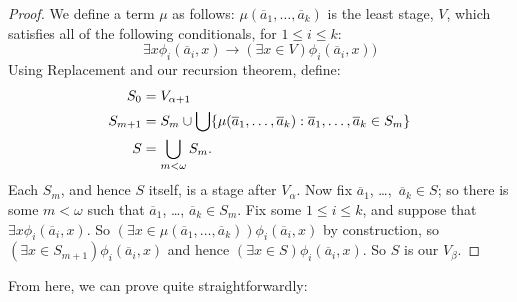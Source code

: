 \documentclass[../../../include/open-logic-section]{subfiles}
\begin{document}
\begin{proof}
We define a term $\mu$ as follows: $\mu(\overline{a}_1, \ldots,
\overline{a}_k)$ is the least stage, $V$, which satisfies all of the
following conditionals, for $1 \leq i \leq k$:
\[
\exists x\phi_i(\overline{a}_i, x) \rightarrow (\exists x \in V) \phi_i(\overline{a}_i, x))
\]
Using Replacement and our recursion theorem, define:
\begin{align*}
	S_0 & = V_{\alpha+1}\\
	S_{m+1} & = S_m \cup \bigcup
	\Setabs{\mu(\overline{a}_1, \ldots, \overline{a}_k)}
	{\overline{a}_1, \ldots, \overline{a}_k \in S_m} \\
	S &= \bigcup_{m < \omega} S_m.
\end{align*}
Each $S_m$, and hence $S$ itself, is a stage after $V_\alpha$. Now fix
$\overline{a}_1$, \dots,~$\overline{a}_k \in S$; so there is some $m <
\omega$ such that $\overline{a}_1$, \dots, $\overline{a}_k \in S_m$.
Fix some $1 \leq i \leq k$, and suppose that $\exists x
\phi_i(\overline{a}_i,x)$. So $(\exists x \in \mu(\overline{a}_1,
\ldots, \overline{a}_k))\phi_i(\overline{a}_i, x)$ by construction, so
$(\exists x \in S_{m+1})\phi_i(\overline{a}_i, x)$ and hence
$(\exists x \in S)\phi_i(\overline{a}_i, x)$. So $S$ is our $V_\beta$.
\end{proof}

From here, we can prove  quite
straightforwardly:
\end{document}
